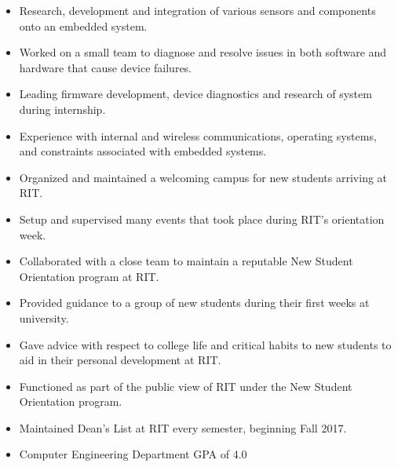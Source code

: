 \documentclass[10pt,a4paper,ragged2e]{altacv}
\begin{document}

\begin{fullwidth}
\makecvheader
\end{fullwidth}




\begin{itemize}
\item Research, development and integration of various sensors and components onto an embedded system.
\smallskip
\item Worked on a small team to diagnose and resolve issues in both software and hardware that cause device failures.
\smallskip
\item Leading firmware development, device diagnostics and research of system during internship.
\smallskip
\item Experience with internal and wireless communications, operating systems, and constraints associated with embedded systems.
\end{itemize}

\divider

\begin{itemize}
\item Organized and maintained a welcoming campus for new students arriving at RIT.
\smallskip
\item Setup and supervised many events that took place during RIT's orientation week.
\item Collaborated with a close team to maintain a reputable New Student Orientation program at RIT.
\end{itemize}

\divider

\begin{itemize}
\item Provided guidance to a group of new students during their first weeks at university.
\smallskip
\item Gave advice with respect to college life and critical habits to new students to aid in their personal development at RIT.
\item Functioned as part of the public view of RIT under the New Student Orientation program.
\end{itemize}

\smallskip
\begin{itemize}
\item Maintained Dean's List at RIT every semester, beginning Fall 2017.
\item Computer Engineering Department GPA of 4.0
\end{itemize}

\clearpage

\nocite{*}
\end{document}

